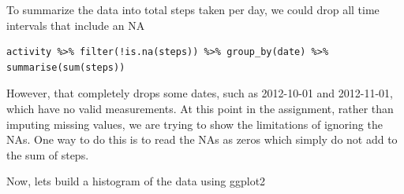 \documentclass[]{article}
\newenvironment{Shaded}{\begin{snugshade}}{\end{snugshade}}
\newcommand{\KeywordTok}[1]{\textcolor[rgb]{0.13,0.29,0.53}{\textbf{{#1}}}}
\newcommand{\DataTypeTok}[1]{\textcolor[rgb]{0.13,0.29,0.53}{{#1}}}
\newcommand{\DecValTok}[1]{\textcolor[rgb]{0.00,0.00,0.81}{{#1}}}
\newcommand{\StringTok}[1]{\textcolor[rgb]{0.31,0.60,0.02}{{#1}}}
\newcommand{\CommentTok}[1]{\textcolor[rgb]{0.56,0.35,0.01}{\textit{{#1}}}}
\newcommand{\NormalTok}[1]{{#1}}
\begin{document}
To summarize the data into total steps taken per day, we could drop all
time intervals that include an NA

\begin{verbatim}
activity %>% filter(!is.na(steps)) %>% group_by(date) %>% summarise(sum(steps))
\end{verbatim}

However, that completely drops some dates, such as 2012-10-01 and
2012-11-01, which have no valid measurements. At this point in the
assignment, rather than imputing missing values, we are trying to show
the limitations of ignoring the NAs. One way to do this is to read the
NAs as zeros which simply do not add to the sum of steps.

\begin{Shaded}
\end{Shaded}

Now, lets build a histogram of the data using ggplot2
\end{document}
